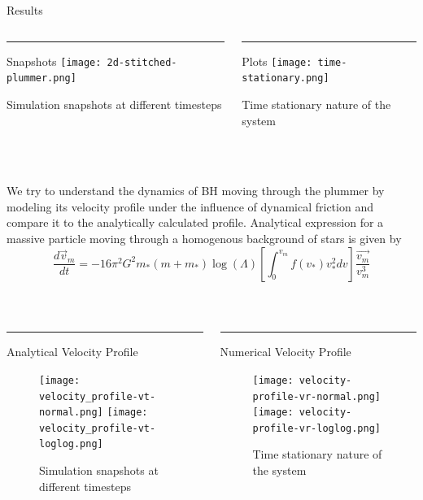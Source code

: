 \documentclass[final]{beamer}
\newlength{\colwidth}
\begin{document}
\begin{frame}[t]
\begin{columns}[t]
\begin{column}{\colwidth}
\begin{block}{Results}
\begin{columns}[T] %
\begin{column}{.48\textwidth}
\color{blue}\rule{\linewidth}{4pt}
Snapshots
\texttt{[image: 2d-stitched-plummer.png]}
\caption{Simulation snapshots at different timesteps}
\end{column}%
\hfill%
\begin{column}{.48\textwidth}
\color{red}\rule{\linewidth}{4pt}
Plots
\texttt{[image: time-stationary.png]}
\caption{Time stationary nature of the system}
\end{column}%
\end{columns}
 \\
  \\
 We try to understand the dynamics of BH moving through the plummer by modeling its velocity profile under the influence of dynamical friction and compare it to the analytically calculated profile.
Analytical expression for a massive particle moving through a homogenous background of stars is given by 
\begin{equation}
    \boxed{\displaystyle{\frac{d \vec{v}_m}{dt}} = -16\pi^2 G^2 m_* (m + m_*) \log (\Lambda) \left[\int_0^{v_m} f(v_*)v^2_* dv \right] \displaystyle{\frac{\vec{v_m}}{v_m^3}} }
\end{equation}
  \end{block}
\\
\begin{columns}[T] %
\begin{column}{.48\textwidth}
\color{blue}\rule{\linewidth}{4pt}
Analytical Velocity Profile
\begin{figure}
    \centering
\texttt{[image: velocity\_profile-vt-normal.png]}
\texttt{[image: velocity\_profile-vt-loglog.png]}
\caption{Simulation snapshots at different timesteps}
    \label{fig:my_label}
\end{figure}

\end{column}%
\hfill%
\begin{column}{.48\textwidth}
\color{red}\rule{\linewidth}{4pt}
Numerical Velocity Profile
\begin{figure}
    \centering
\texttt{[image: velocity-profile-vr-normal.png]}
\texttt{[image: velocity-profile-vr-loglog.png]}
\caption{Time stationary nature of the system}
    \label{fig:my_label}
\end{figure}


\end{column}
\end{columns}
\end{column}
\end{columns}
\end{frame}
\end{document}
